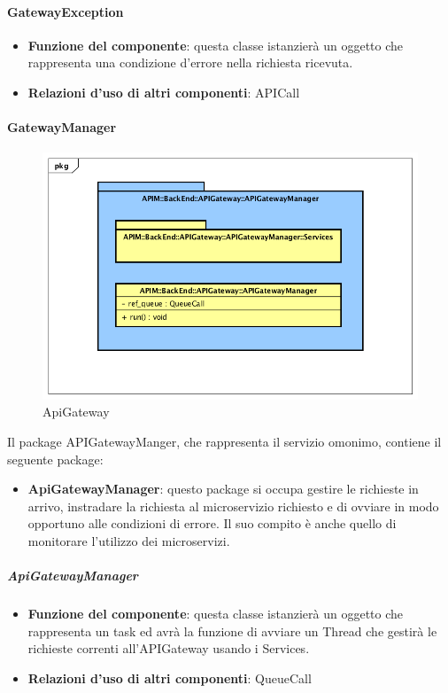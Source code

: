 \paragraph{GatewayException}
\begin{itemize}
	\item \textbf{Funzione del componente}: questa classe istanzier\`{a} un oggetto che rappresenta una condizione d'errore nella richiesta ricevuta.
	\item \textbf{Relazioni d'uso di altri componenti}: APICall
\end{itemize}

\paragraph{GatewayManager}
\begin{figure}[!htbp]
	\centering
	\includegraphics[scale=0.45]{UML/DiagrammiPackage/APIGatewayManager.png}
	\caption{ApiGateway}
\end{figure}

Il package APIGatewayManger, che rappresenta il servizio omonimo, contiene il seguente package:
\begin{itemize}
	\item \textbf{ApiGatewayManager}: questo package si occupa gestire le richieste in arrivo, instradare la richiesta al microservizio richiesto e di ovviare in modo opportuno alle condizioni di errore. Il suo compito \`{e} anche quello di monitorare  l'utilizzo dei microservizi.
\end{itemize}

\subparagraph{ApiGatewayManager}
\begin{itemize}
	\item \textbf{Funzione del componente}: questa classe istanzier\`{a} un oggetto che rappresenta un task ed avr\`{a} la funzione di avviare un Thread che gestir\`{a} le richieste correnti all'APIGateway usando i Services.
	\item \textbf{Relazioni d'uso di altri componenti}: QueueCall
\end{itemize}


